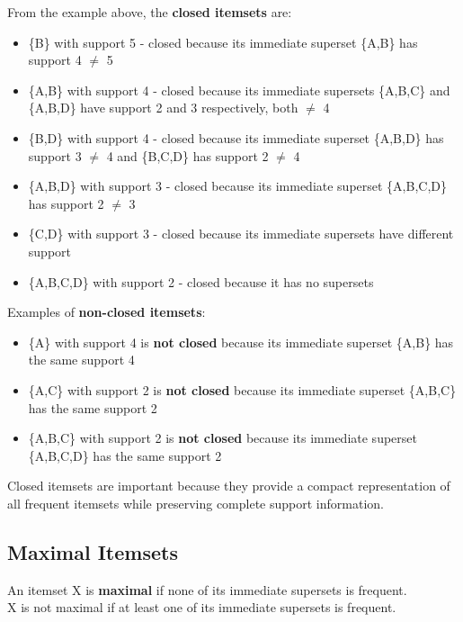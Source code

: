 From the example above, the \textbf{closed itemsets} are:
\begin{itemize}
   \item \{B\} with support 5 - closed because its immediate superset \{A,B\} has support 4 $\neq$ 5
   \item \{A,B\} with support 4 - closed because its immediate supersets \{A,B,C\} and \{A,B,D\} have support 2 and 3 respectively, both $\neq$ 4
   \item \{B,D\} with support 4 - closed because its immediate superset \{A,B,D\} has support 3 $\neq$ 4 and \{B,C,D\} has support 2 $\neq$ 4
   \item \{A,B,D\} with support 3 - closed because its immediate superset \{A,B,C,D\} has support 2 $\neq$ 3
   \item \{C,D\} with support 3 - closed because its immediate supersets have different support
   \item \{A,B,C,D\} with support 2 - closed because it has no supersets
\end{itemize}

Examples of \textbf{non-closed itemsets}:
\begin{itemize}
   \item \{A\} with support 4 is \textbf{not closed} because its immediate superset \{A,B\} has the same support 4
   \item \{A,C\} with support 2 is \textbf{not closed} because its immediate superset \{A,B,C\} has the same support 2
   \item \{A,B,C\} with support 2 is \textbf{not closed} because its immediate superset \{A,B,C,D\} has the same support 2
\end{itemize}

Closed itemsets are important because they provide a compact representation of all frequent itemsets while preserving complete support information.

\subsection{Maximal Itemsets}

\begin{definition}
   An itemset X is \textbf{maximal} if none of its immediate supersets
   is frequent.\\
   X is not maximal if at least one of its immediate supersets
   is frequent.
\end{definition}

